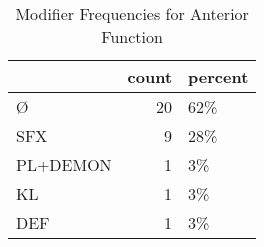 \begin{table}[htbp!]
\centering
\caption{Modifier Frequencies for Anterior Function}
\label{table:ant_mod_cp}
\begin{tabular}{lrl}
\toprule
{} &  count & percent \\
\midrule
Ø        &     20 &     62\% \\
SFX      &      9 &     28\% \\
PL+DEMON &      1 &      3\% \\
KL       &      1 &      3\% \\
DEF      &      1 &      3\% \\
\bottomrule
\end{tabular}
\end{table}
